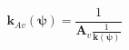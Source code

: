 \begin{equation}
\label{eq:mass-matrix-kav}
\mathbf{k}_{Av}(\boldsymbol{\psi}) = \frac{1}{\mathbf{A}_v\frac{1}{\mathbf{k}(\boldsymbol{\psi})}}
\end{equation}
